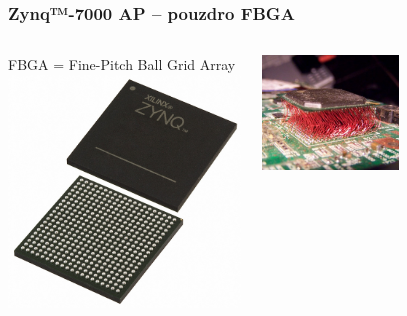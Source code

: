 \documentclass{beamer}
\begin{document}
\begin{frame}
\frametitle{Zynq™-7000 AP -- pouzdro FBGA}

\begin{columns}
\begin{column}{0.5\textwidth}
  \begin{center}
    FBGA = Fine-Pitch Ball Grid Array
    \includegraphics[width=1.0\textwidth]{fig/zynq-fbga-package.jpg}
  \end{center}
  \vfil
\end{column}
\begin{column}{0.5\textwidth}
  \begin{center}
    \includegraphics[width=0.55\textwidth]{fig/bga-soldering-clumsy.jpg}
    \newline

\end{center}
\end{column}
\end{columns}
\end{frame}
\end{document}
